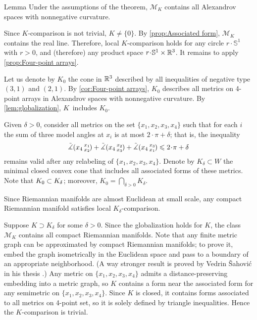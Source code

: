 \documentclass[a4paper,10pt]{article}
\begin{document}
\begin{thm}{Lemma}\label{lem:globalization}
Under the assumptions of the theorem, $\mathcal{M}_K$ contains all Alexandrov spaces with nonnegative curvature.
\end{thm}

Since $K$-comparison is not trivial, $K\ne\{0\}$.
By \ref{prop:Associated form}, $\mathcal{M}_K$ contains the real line.
Therefore, local $K$-comparison holds
for any circle $r\cdot \mathbb{S}^1$ with $r>0$, and (therefore) any product space $r\cdot \mathbb{S}^1\times\RR^3$.
It remains to apply \ref{prop:Four-point arrays}.
\qeds

Let us denote by $K_0$ the cone in $\mathbb{R}^3$ described by all inequalities of negative type $(3,1)$ and $(2,1)$.
By \ref{cor:Four-point arrays}, $K_0$ describes all metrics on 4-point arrays in Alexandrov spaces with nonnegative curvature.
By \ref{lem:globalization},  $K$~includes $K_0$.

Given $\delta>0$, consider all metrics on the set $\{x_1,x_2,x_3,x_4\}$ such that for each $i$
the sum of three model angles at $x_i$ is at most $2\cdot\pi+\delta$; that is, the inequality
\[\angk{x_4}{x_1}{x_2}+\angk{x_4}{x_2}{x_3}+\angk{x_4}{x_3}{x_1}\le 2\cdot\pi+\delta\]
remains valid after any relabeling of $\{x_1,x_2,x_3,x_4\}$.
Denote by $K_\delta\subset W$ the minimal closed convex cone that includes all associated forms of these metrics.
Note that $K_0\z\subset K_\delta$;
moreover, $K_0=\bigcap_{\delta>0} K_\delta$.

Since Riemannian manifolds are almost Euclidean at small scale,
any compact Riemannian manifold satisfies local $K_\delta$-comparison.

Suppose $K\supset K_\delta$ for some $\delta>0$.
Since the globalization holds for $K$, the class $\mathcal{M}_K$ contains all compact Riemannian manifolds.
Note that any finite metric graph can be approximated by compact Riemannian manifolds;
to prove it, embed the graph isometrically in the Euclidean space and pass to a boundary of an appropriate
neighborhood.
(A way stronger result is proved by Vedrin Šahović in his thesis \cite{sahovic2009}.)
Any metric on $\{x_1,x_2,x_3,x_4\}$ admits a distance-preserving embedding into a metric graph, so $K$ contains a form near the associated form for any semimetric on $\{x_1,x_2,x_3,x_4\}$.
Since $K$ is closed, it contains forms associated to all metrics on 4-point set, so it is solely defined by triangle inequalities.
Hence the $K$-comparison is trivial.
\end{document}
